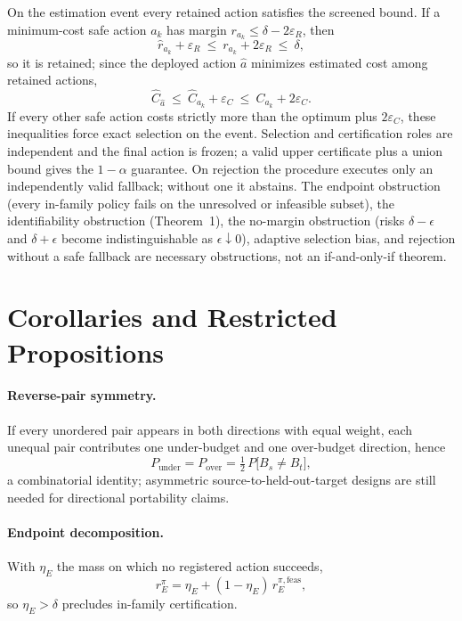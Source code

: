 \documentclass{article}
\begin{document}
On the estimation event every retained action satisfies the screened bound. If a minimum-cost safe action
$a_k$ has margin $r_{a_k}\le\delta-2\varepsilon_R$, then
\begin{equation}
\hat r_{a_{k}}+\varepsilon_{R}\ \le\ r_{a_{k}}+2\varepsilon_{R}\ \le\ \delta,
\label{eq:retain}
\end{equation}
so it is retained; since the deployed action $\hat a$ minimizes estimated cost among retained actions,
\begin{equation}
\hat C_{\hat a}\ \le\ \hat C_{a_{k}}+\varepsilon_{C}\ \le\ C_{a_{k}}+2\varepsilon_{C}.
\label{eq:cost}
\end{equation}
If every other safe action costs strictly more than the optimum plus $2\varepsilon_C$, these inequalities
force exact selection on the event. Selection and certification roles are independent and the final action
is frozen; a valid upper certificate plus a union bound gives the $1-\alpha$ guarantee. On rejection the
procedure executes only an independently valid fallback; without one it abstains. The endpoint obstruction
(every in-family policy fails on the unresolved or infeasible subset), the identifiability obstruction
(Theorem~1), the no-margin obstruction (risks $\delta-\epsilon$ and $\delta+\epsilon$ become
indistinguishable as $\epsilon\downarrow0$), adaptive selection bias, and rejection without a safe fallback
are necessary obstructions, not an if-and-only-if theorem.

\section{Corollaries and Restricted Propositions}
\label{app:corollaries}

\paragraph{Reverse-pair symmetry.} If every unordered pair appears in both directions with equal weight,
each unequal pair contributes one under-budget and one over-budget direction, hence
\begin{equation}
P_{\mathrm{under}}=P_{\mathrm{over}}=\tfrac{1}{2}\,P\bigl[B_{s}\neq B_{t}\bigr],
\label{eq:sym}
\end{equation}
a combinatorial identity; asymmetric source-to-held-out-target designs are still needed for directional
portability claims.

\paragraph{Endpoint decomposition.} With $\eta_E$ the mass on which no registered action succeeds,
\begin{equation}
r_{E}^{\pi}=\eta_{E}+(1-\eta_{E})\,r_{E}^{\pi,\mathrm{feas}},
\label{eq:endpoint}
\end{equation}
so $\eta_E>\delta$ precludes in-family certification.
\end{document}
